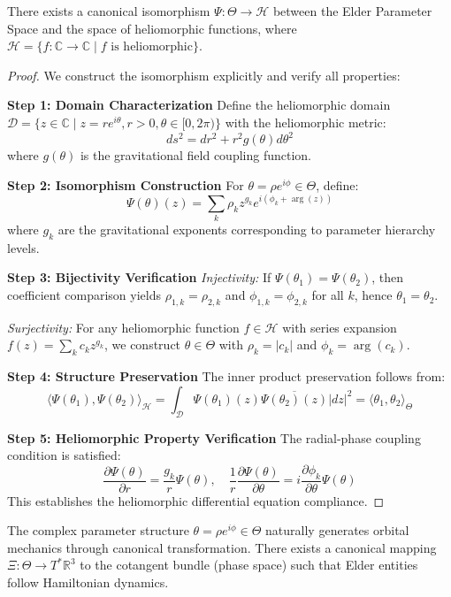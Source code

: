 \begin{theorem}
\label{thm:heliomorphic_connection}
There exists a canonical isomorphism $\Psi: \Theta \rightarrow \mathcal{H}$ between the Elder Parameter Space and the space of heliomorphic functions, where $\mathcal{H} = \{f: \mathbb{C} \rightarrow \mathbb{C} \mid f \text{ is heliomorphic}\}$.
\end{theorem}

\begin{proof}
We construct the isomorphism explicitly and verify all properties:

\textbf{Step 1: Domain Characterization}
Define the heliomorphic domain $\mathcal{D} = \{z \in \mathbb{C} \mid z = re^{i\theta}, r > 0, \theta \in [0,2\pi)\}$ with the heliomorphic metric:
$$ds^2 = dr^2 + r^2 g(\theta) d\theta^2$$
where $g(\theta)$ is the gravitational field coupling function.

\textbf{Step 2: Isomorphism Construction}
For $\theta = \rho e^{i\phi} \in \Theta$, define:
$$\Psi(\theta)(z) = \sum_{k} \rho_k z^{g_k} e^{i(\phi_k + \arg(z))}$$
where $g_k$ are the gravitational exponents corresponding to parameter hierarchy levels.

\textbf{Step 3: Bijectivity Verification}
\textit{Injectivity:} If $\Psi(\theta_1) = \Psi(\theta_2)$, then coefficient comparison yields $\rho_{1,k} = \rho_{2,k}$ and $\phi_{1,k} = \phi_{2,k}$ for all $k$, hence $\theta_1 = \theta_2$.

\textit{Surjectivity:} For any heliomorphic function $f \in \mathcal{H}$ with series expansion $f(z) = \sum_k c_k z^{g_k}$, we construct $\theta \in \Theta$ with $\rho_k = |c_k|$ and $\phi_k = \arg(c_k)$.

\textbf{Step 4: Structure Preservation}
The inner product preservation follows from:
$$\langle \Psi(\theta_1), \Psi(\theta_2) \rangle_{\mathcal{H}} = \int_{\mathcal{D}} \Psi(\theta_1)(z) \overline{\Psi(\theta_2)(z)} |dz|^2 = \langle \theta_1, \theta_2 \rangle_\Theta$$

\textbf{Step 5: Heliomorphic Property Verification}
The radial-phase coupling condition is satisfied:
$$\frac{\partial \Psi(\theta)}{\partial r} = \frac{g_k}{r} \Psi(\theta), \quad \frac{1}{r}\frac{\partial \Psi(\theta)}{\partial \theta} = i\frac{\partial \phi_k}{\partial \theta} \Psi(\theta)$$
This establishes the heliomorphic differential equation compliance.
\end{proof}

\begin{theorem}
\label{thm:orbital_mechanics_emergence}
The complex parameter structure $\theta = \rho e^{i\phi} \in \Theta$ naturally generates orbital mechanics through canonical transformation. There exists a canonical mapping $\Xi: \Theta \rightarrow T^*\mathbb{R}^3$ to the cotangent bundle (phase space) such that Elder entities follow Hamiltonian dynamics.
\end{theorem}

